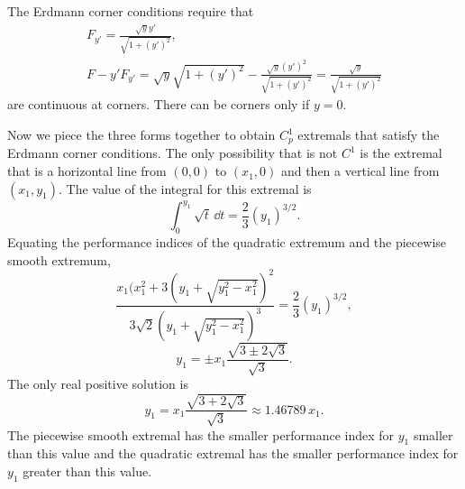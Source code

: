\begin{Solution}
  The Erdmann corner conditions require that
  \begin{gather*}
    F_{y'} = \frac{ \sqrt{y} y' }{ \sqrt{ 1 + (y')^2 } }, \\
    F - y' F_{y'} = \sqrt{y} \sqrt{1 + (y')^2}
    - \frac{ \sqrt{y} (y')^2 }{ \sqrt{ 1 + (y')^2 } }
    = \frac{ \sqrt{y} }{ \sqrt{ 1 + (y')^2 } }
  \end{gather*}
  are continuous at corners.  There can be corners only if $y = 0$.  

  Now we piece the three forms together to obtain $C^1_p$ extremals that
  satisfy the Erdmann corner conditions.  The only possibility that is not 
  $C^1$ is the extremal
  that is a horizontal line from $(0,0)$ to $(x_1,0)$ and then a vertical
  line from $(x_1,y_1)$.  The value of the integral for this extremal is
  \[
  \int_0^{y_1} \sqrt{t} \,\dd t = \frac{2}{3} (y_1)^{3/2}.
  \]
  Equating the performance indices of the quadratic extremum and the 
  piecewise smooth extremum,
  \[
  \frac{ x_1 (x_1^2 + 3( y_1 + \sqrt{y_1^2 - x_1^2} )^2 }
  { 3 \sqrt{2} ( y_1 + \sqrt{ y_1^2 - x_1^2} )^3 } = 
  \frac{2}{3} (y_1)^{3/2},
  \]
  \[
  y_1 = \pm x_1 \frac{ \sqrt{3 \pm 2 \sqrt{3}} }{ \sqrt{3} }.
  \]
  The only real positive solution is
  \[
  y_1 = x_1 \frac{ \sqrt{3 + 2 \sqrt{3}} }{ \sqrt{3} } \approx 1.46789\, x_1.
  \]
  The piecewise smooth extremal has the smaller performance index for 
  $y_1$ smaller than this value and the quadratic extremal has the smaller
  performance index for $y_1$ greater than this value.


  \begin{center}
  \end{center}
\end{Solution}



